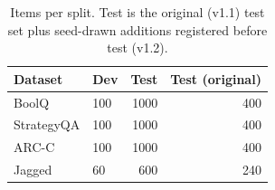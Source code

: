 \begin{table}[t]
\centering
\small
\caption{Items per split. Test is the original (v1.1) test set plus seed-drawn additions registered before test (v1.2).}
\label{tab:data}
\begin{tabular}{llrr}
\toprule
Dataset & Dev & Test & Test (original) \\
\midrule
BoolQ & 100 & 1000 & 400 \\
StrategyQA & 100 & 1000 & 400 \\
ARC-C & 100 & 1000 & 400 \\
Jagged & 60 & 600 & 240 \\
\bottomrule
\end{tabular}
\end{table}
